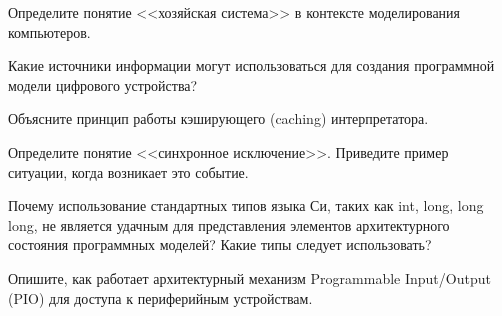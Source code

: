 \documentclass[a4paper, addpoints]{exam}
\begin{document}
\begin{questions}




\question[2] Определите понятие <<хозяйская система>> в контексте моделирования компьютеров.
\begin{solution}[2cm]
\end{solution}

\question[2] Какие источники информации могут использоваться для создания программной модели цифрового устройства?
\begin{solution}[2cm]
\end{solution}

\question[2] Объясните принцип работы кэширующего (caching) интерпретатора.
\begin{solution}[2cm]
\end{solution}

\question[2] Определите понятие <<синхронное исключение>>. Приведите пример ситуации, когда возникает это событие.
\begin{solution}[2cm]
\end{solution}

\question[2] Почему использование стандартных типов языка Си, таких как int, long, long long, не является удачным для представления элементов архитектурного состояния программных моделей? Какие типы следует использовать?
\begin{solution}[2cm]
\end{solution}

\question[2] Опишите, как работает архитектурный механизм Programmable Input/Output (PIO) для доступа к периферийным устройствам.
\begin{solution}[2cm]
\end{solution}


\end{questions}
\end{document}
